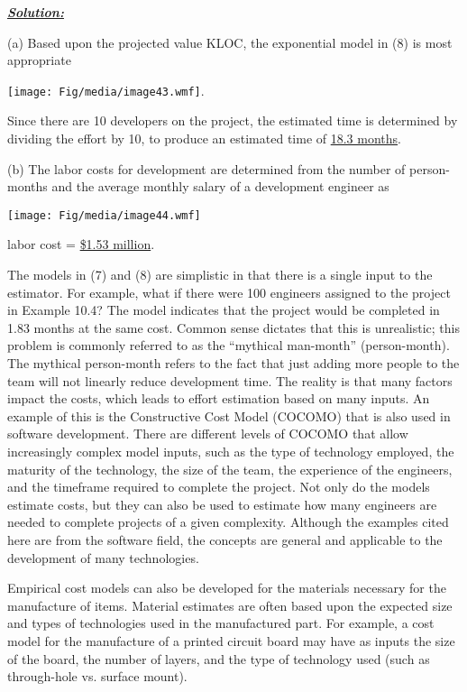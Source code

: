 \emph{\textbf{\ul{Solution:}}}

(a) Based upon the projected value KLOC, the exponential model in (8) is
most appropriate

\texttt{[image: Fig/media/image43.wmf]}.

Since there are 10 developers on the project, the estimated time is
determined by dividing the effort by 10, to produce an estimated time of
\ul{18.3 months}.

(b) The labor costs for development are determined from the number of
person-months and the average monthly salary of a development engineer
as

\texttt{[image: Fig/media/image44.wmf]}

labor cost = \ul{\$1.53 million}.

The models in (7) and (8) are simplistic in that there is a single input
to the estimator. For example, what if there were 100 engineers assigned
to the project in Example 10.4? The model indicates that the project
would be completed in 1.83 months at the same cost. Common sense
dictates that this is unrealistic; this problem is commonly referred to
as the ``mythical man-month'' (person-month). The mythical person-month
refers to the fact that just adding more people to the team will not
linearly reduce development time. The reality is that many factors
impact the costs, which leads to effort estimation based on many inputs.
An example of this is the Constructive Cost Model (COCOMO) that is also
used in software development. There are different levels of COCOMO that
allow increasingly complex model inputs, such as the type of technology
employed, the maturity of the technology, the size of the team, the
experience of the engineers, and the timeframe required to complete the
project. Not only do the models estimate costs, but they can also be
used to estimate how many engineers are needed to complete projects of a
given complexity. Although the examples cited here are from the software
field, the concepts are general and applicable to the development of
many technologies.

Empirical cost models can also be developed for the materials necessary
for the manufacture of items. Material estimates are often based upon
the expected size and types of technologies used in the manufactured
part. For example, a cost model for the manufacture of a printed circuit
board may have as inputs the size of the board, the number of layers,
and the type of technology used (such as through-hole vs. surface
mount).

